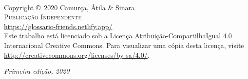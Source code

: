 \documentclass[fleqn]{book} %
\begin{document}

\begingroup
\thispagestyle{empty} %
\vfill
\endgroup


\newpage
~\vfill
\thispagestyle{empty}

\noindent Copyright \copyright\ 2020 Camurça, Átila \& Sinara\\ %

\noindent \textsc{Publicação Independente}\\ %

\noindent \url{https://glossario-friends.netlify.app/}\\ %

\noindent Este trabalho está licenciado sob a Licença Atribuição-CompartilhaIgual 4.0
Internacional Creative Commons. Para visualizar uma cópia desta licença, visite
\url{http://creativecommons.org/licenses/by-sa/4.0/}.

\noindent \textit{Primeira edição, 2020} %

\newpage
\thispagestyle{empty}



\usechapterimagefalse %
\end{document}
